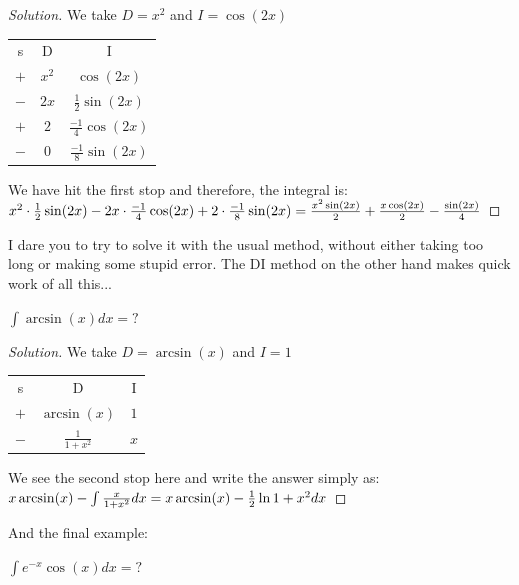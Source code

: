 \begin{proof}
    [Solution]
    We take $D=x^2$ and $I=\cos(2x)$
    \begin{table}[ht]
        \centering
        \begin{tabular}{c|c|c}
            s & D & I\\
            $+$ & $x^2$ & $\cos(2x)$\\
            $-$ & $2x$ & $\frac{1}{2}\sin(2x)$\\
            $+$ & $2$ & $\frac{-1}{4}\cos(2x)$\\
            $-$ & $0$ & $\frac{-1}{8}\sin(2x)$\\
        \end{tabular}
    \end{table}
    We have hit the first stop and therefore, the integral is:\\
    $x^2 \cdot \frac{1}{2}\sin(2x) - 2x \cdot \frac{-1}{4}\cos(2x) + 2 \cdot \frac{-1}{8}\sin(2x)\\
    = \frac{x^2\sin(2x)}{2}+\frac{x\cos(2x)}{2}-\frac{\sin(2x)}{4}$
\end{proof}
I dare you to try to solve it with the usual method, without either taking too long or making some stupid error. The DI method on the other hand makes quick work of all this...\\
\begin{example}
    $\int \arcsin(x)dx=?$
\end{example}
\begin{proof}
    [Solution]
    We take $D=\arcsin(x)$ and $I=1$
    \begin{table}[ht]
        \centering
        \begin{tabular}{c|c|c}
            s & D & I\\
            $+$ & $\arcsin(x)$ & $1$\\
            $-$ & $\frac{1}{1+x^2}$ & $x$\\
        \end{tabular}
    \end{table}
    We see the second stop here and write the answer simply as:\\
    $x\arcsin(x)-\int \frac{x}{1+x^2} dx\\
    = x\arcsin(x)-\frac{1}{2} \ln{1+x^2} dx$
\end{proof}
And the final example:\\
\begin{example}
    $\int e^{-x}\cos(x)dx=?$
\end{example}
